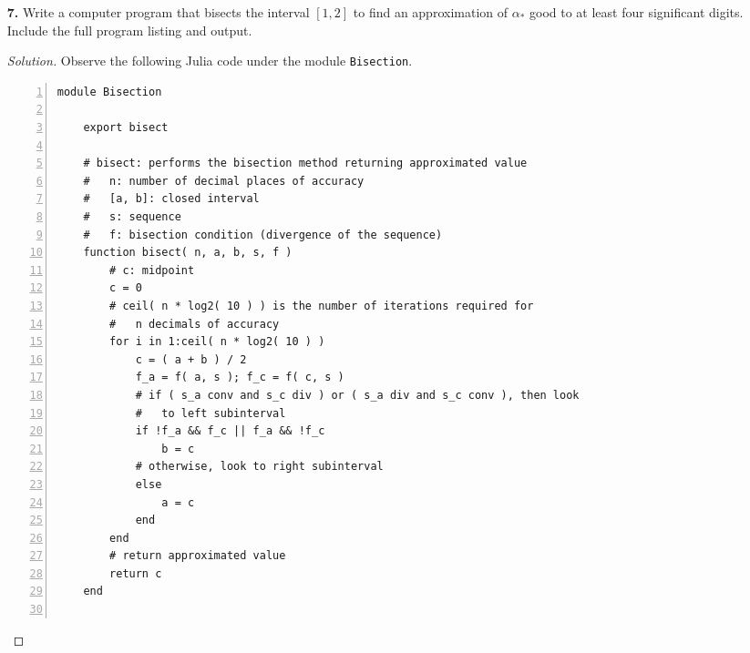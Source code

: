 \documentclass[ 12pt ]{article}
\begin{document}
\begin{enumerate}
		\begin{proof}[Solution]\renewcommand{\qedsymbol}{}
			Suppose that $|x_{2n+1}|$ is bounded for the entirety of a nondegenerate interval of $\alpha$. Further, suppose we obtain two particular values of $\alpha$ where the
			lesser value has the sequence diverge and the greater requires it to be bounded as $n \to \infty$. As we would approximate a root of a polynomial, we can apply the
			bisection method to estimate $\alpha_*$. The algorithm would be defined as follows:
			\begin{itemize}
				\item Calculate the midpoint of our interval containing the infimum and determine if our sequence is divergent using that value.
				\item If the left endpoint is convergent and the midpoint is divergent or the left endpoint is divergent and the midpoint is divergent then let the midpoint be the
					new right endpoint. In any other condition, let midpoint be the new left endpoint.
				\item Repeat the process with the new subinterval until an appropriate precision is achieved.
			\end{itemize}
		\end{proof}


	\item[\textbf{7.}] Write a computer program that bisects the interval $[1, 2]$ to find an approximation of $\alpha_*$ good to at least four significant digits. Include the full
		program listing and output.

		\begin{proof}[Solution]\renewcommand{\qedsymbol}{}
			Observe the following Julia code under the module \verb|Bisection|.
			\begin{lstlisting}[basicstyle=\ttfamily\footnotesize, numbers=left, tabsize=4, frame=single]
module Bisection

	export bisect

	# bisect: performs the bisection method returning approximated value
	#	n: number of decimal places of accuracy
	#	[a, b]: closed interval
	#	s: sequence
	#	f: bisection condition (divergence of the sequence)
	function bisect( n, a, b, s, f )
		# c: midpoint
		c = 0
		# ceil( n * log2( 10 ) ) is the number of iterations required for
		# 	n decimals of accuracy
		for i in 1:ceil( n * log2( 10 ) )
			c = ( a + b ) / 2
			f_a = f( a, s ); f_c = f( c, s )
			# if ( s_a conv and s_c div ) or ( s_a div and s_c conv ), then look
			# 	to left subinterval
			if !f_a && f_c || f_a && !f_c
				b = c
			# otherwise, look to right subinterval
			else
				a = c
			end
		end
		# return approximated value
		return c
	end


\end{lstlisting}
\end{proof}
\end{enumerate}
\end{document}
